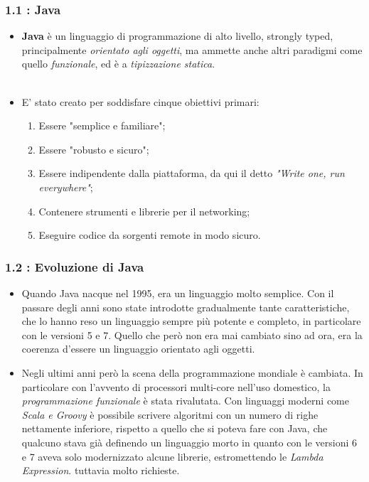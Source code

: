 \documentclass{beamer}
\begin{document}
\begin{frame}
	\frametitle{\textbf{1.1 : Java}}
	\begin{itemize}
		\item
			\textbf{Java} è un linguaggio di programmazione di alto livello, strongly typed, principalmente \textit{orientato agli oggetti}, ma ammette anche altri paradigmi come quello \textit{funzionale}, ed è a \textit{tipizzazione statica}.\\\
		\item
			E' stato creato per soddisfare cinque obiettivi primari:
			\begin{enumerate}
				\item
					Essere "semplice e familiare";
				\item
					Essere "robusto e sicuro";
				\item
					Essere indipendente dalla piattaforma, da qui il detto \textit{"Write one, run everywhere"};
				\item
					Contenere strumenti e librerie per il networking;
				\item
					Eseguire codice da sorgenti remote in modo sicuro.
			\end{enumerate}
	\end{itemize}
\end{frame}


\begin{frame}
	\frametitle{\textbf{1.2 : Evoluzione di Java}}
		\begin{itemize}
			\item
				Quando Java nacque nel 1995, era un linguaggio molto semplice. Con il passare degli anni sono state introdotte gradualmente tante caratteristiche, che lo hanno reso un linguaggio sempre più potente e completo, in particolare con le versioni 5 e 7. Quello che però non era mai cambiato sino ad ora, era la coerenza d'essere un linguaggio orientato agli oggetti.
			\item 
				Negli ultimi anni però la scena della programmazione mondiale è cambiata. In particolare con l'avvento di processori multi-core nell'uso domestico, la \textit{programmazione funzionale} è stata rivalutata. Con linguaggi moderni come \textit{Scala e Groovy} è possibile scrivere algoritmi con un numero di righe nettamente inferiore, rispetto a quello che si poteva fare con Java, che qualcuno stava già definendo un linguaggio morto in quanto con le versioni 6 e 7 aveva solo modernizzato alcune librerie, estromettendo le \textit{Lambda Expression}. tuttavia molto richieste.
		\end{itemize}
\end{frame}
\end{document}

